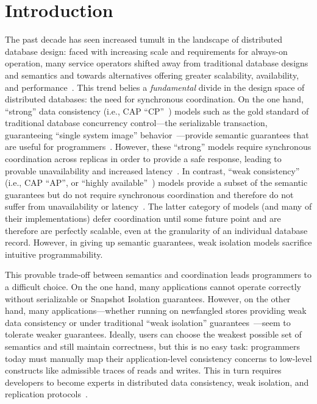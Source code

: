 
\section{Introduction}
\label{sec:intro}

The past decade has seen increased tumult in the landscape of
distributed database design: faced with increasing scale and
requirements for always-on operation, many service operators shifted
away from traditional database designs and semantics and towards
alternatives offering greater scalability, availability, and
performance~\cite{dynamo,bigtable,cassandra,brewer-base}. This trend
belies a \textit{fundamental} divide in the design space of
distributed databases: the need for synchronous coordination. On the
one hand, ``strong'' data consistency (i.e., CAP
``CP''~\cite{gilbert-cap}) models such as the gold standard of
traditional database concurrency control---the serializable
transaction, guaranteeing ``single system image''
behavior~\cite{gray-virtues}---provide semantic guarantees that are
useful for programmers~\cite{bernstein-book}. However, these
``strong'' models require synchronous coordination across replicas in
order to provide a safe response, leading to provable unavailability
and increased latency~\cite{pacelc}. In contrast, ``weak consistency''
(i.e., CAP ``AP'', or ``highly available''~\cite{gilbert-cap}) models
provide a subset of the semantic guarantees but do not require
synchronous coordination and therefore do not suffer from
unavailability or latency~\cite{hat-vldb}. The latter category of
models (and many of their implementations) defer coordination until
some future point and are therefore are perfectly scalable, even at
the granularity of an individual database record. However, in giving
up semantic guarantees, weak isolation models sacrifice intuitive
programmability.

This provable trade-off between semantics and coordination leads
programmers to a difficult choice. On the one hand, many applications
cannot operate correctly without serializable or Snapshot Isolation
guarantees. However, on the other hand, many applications---whether
running on newfangled stores providing weak data consistency or under
traditional ``weak isolation'' guarantees~\cite{adya-isolation}---seem
to tolerate weaker guarantees. Ideally, users can choose the weakest
possible set of semantics and still maintain correctness, but this is
no easy task: programmers today must manually map their
application-level consistency concerns to low-level constructs like
admissible traces of reads and writes. This in turn requires
developers to become experts in distributed data consistency, weak
isolation, and replication protocols~\cite{consistency-borders}.

